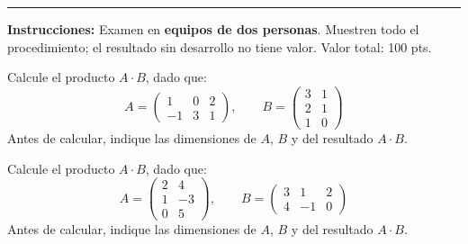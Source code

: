 \documentclass[12pt]{article}
\begin{document}
\vspace{0.2cm}
\noindent\rule{\textwidth}{0.8pt}
\vspace{0.15cm}

\noindent\textbf{Instrucciones:} Examen en \textbf{equipos de dos personas}. Muestren todo el procedimiento; el resultado sin desarrollo no tiene valor. Valor total: 100 pts.

\vspace{0.5cm}


\begin{ejercicio}[30 pts.]
Calcule el producto $A \cdot B$, dado que:
\[
A = \begin{pmatrix} 1 & 0 & 2 \\ -1 & 3 & 1 \end{pmatrix}, \qquad
B = \begin{pmatrix} 3 & 1 \\ 2 & 1 \\ 1 & 0 \end{pmatrix}
\]
Antes de calcular, indique las dimensiones de $A$, $B$ y del resultado $A\cdot B$.
\end{ejercicio}


\vspace{6cm}

\begin{ejercicio}[30 pts.]
Calcule el producto $A \cdot B$, dado que:
\[
A = \begin{pmatrix} 2 & 4 \\ 1 & -3 \\ 0 & 5 \end{pmatrix}, \qquad
B = \begin{pmatrix} 3 & 1 & 2 \\ 4 & -1 & 0 \end{pmatrix}
\]
Antes de calcular, indique las dimensiones de $A$, $B$ y del resultado $A\cdot B$.
\end{ejercicio}
\end{document}
